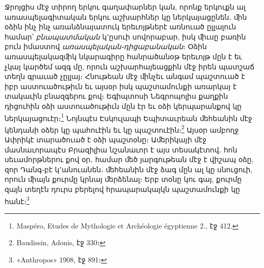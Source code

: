 \documentclass{article}
\begin{document}
{Ջրոյցիս մէջ տիրող երկու գաղափարներ կան, որոնք երկուքն ալ առասպելագիտական երկու աշխարհներ կը ներկայացընեն․ ﬕն օձին ինչ ինչ առանձնայատուկ երեւոյթներէ առնուած ըլլալուն համար՝ \emph{բնապատմական} կ՚ըսուի սովորաբար, իսկ ﬕւսը բառին բուն իմաստով \emph{առասպելական֊դիցաբանական}։ Օձին առասպելակազﬕկ նկարագիրը հանրածանօթ երեւոյթ մըն է եւ չկայ կարծեմ ազգ մը, որուն աշխարհայեացքին մէջ իրեն պատշաճ տեղն գրաւած չըլլայ։ Հնութեան մէջ ﬕնչեւ անգամ պաշտուած է իբր աստուածութիւն եւ այսօր իսկ պաշտամունքի առարկայ է տակաւին բնազգերու քով։ Եգիպտոսի Նեգրոպոլիս քաղքին դիցուհին օձի աստուածութիւն մըն էր եւ օձի կերպարանքով կը ներկայացուէր։\footnote{Maspéro, Etudes de Mythologie et Archéologie égyptienne 2., էջ 412.} Նոյնպէս Էսկուլապի Եպիտաւրեան ﬔհեանին մէջ կենդանի օձեր կը պահուէին եւ կը պաշտուէին։\footnote{Baudissin, Adonis, էջ 330։} Այսօր ամբողջ Ափրիկէ տարածուած է օձի պաշտօնը։ Աﬔրիկայի մէջ մասնաւորապէս Բրազիլիա նշանաւոր է այս տեսակէտով․ հոն սեւամորթներու քով օր․ համար ﬔծ յարգութեան մէջ է վիշապ օձը, զոր Դանգ֊բէ կ՚անուանեն․ ﬔհեանին մէջ ձագ մըն ալ կը սնուցուի, որուն ﬕայն քուրմը կրնայ ﬔրձենալ։ Երբ տօնը կու գայ, քուրմը զայն տեղէն դուրս բերելով հրապարակայկն պաշտամունքի կը հանէ։\footnote{«Anthropos» 1908, էջ 891։}

}
\end{document}
